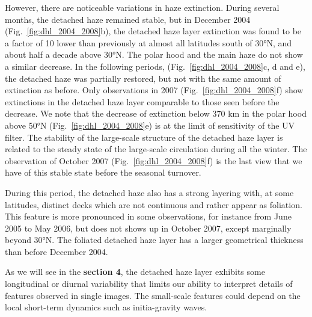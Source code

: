 However, there are noticeable variations in haze extinction. During several months, the
detached haze remained stable, but in December 2004 (Fig.~\ref{fig:dhl_2004_2008}b),
the detached haze layer extinction was found to be a factor of 10 lower than previously at almost all latitudes south
of \ang{30}N, and about half a decade above \ang{30}N. The polar hood and the main haze do not show a similar decrease.
In the following periods, (Fig.~\ref{fig:dhl_2004_2008}c, d and e),
the detached haze was partially restored, but not with the same amount of extinction as before. Only observations in
2007 (Fig.~\ref{fig:dhl_2004_2008}f) show extinctions in the detached haze layer comparable to those seen before
the decrease. We note that the decrease of extinction below 370 km in the polar hood above \ang{50}N
(Fig.~\ref{fig:dhl_2004_2008}e) is at the limit of sensitivity of the UV filter. The stability of the large-scale
structure of the detached haze layer is related to the steady state of the large-scale circulation during all the winter.
The observation of October 2007 (Fig.~\ref{fig:dhl_2004_2008}f) is the last view that we have of this stable state
before the seasonal turnover.

During this period, the detached haze also has a strong layering with, at some latitudes, distinct decks which are not
continuous and rather appear as foliation. This feature is more pronounced in some observations, for instance from
June 2005 to May 2006, but does not shows up in October 2007, except marginally beyond \ang{30}N. The foliated detached
haze layer has a larger geometrical thickness than before December 2004.

As we will see in the \textbf{section 4}, the detached haze layer exhibits some longitudinal or diurnal variability
that limits our ability to interpret details of features observed in single images. The small-scale features
could depend on the local short-term dynamics such as initia-gravity waves.
